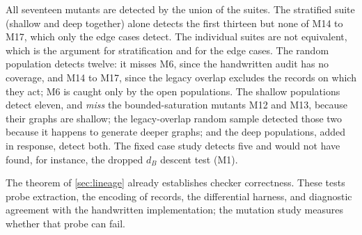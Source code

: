All seventeen mutants are detected by the union of the suites. The stratified suite (shallow and deep together) alone detects the first thirteen but none of M14 to M17, which only the edge cases detect. The individual suites are not equivalent, which is the argument for stratification and for the edge cases. The random population detects twelve: it misses M6, since the handwritten audit has no coverage, and M14 to M17, since the legacy overlap excludes the records on which they act; M6 is caught only by the open populations. The shallow populations detect eleven, and \emph{miss} the bounded-saturation mutants M12 and M13, because their graphs are shallow; the legacy-overlap random sample detected those two because it happens to generate deeper graphs; and the deep populations, added in response, detect both. The fixed case study detects five and would not have found, for instance, the dropped $d_B$ descent test (M1).

The theorem of \cref{sec:lineage} already establishes checker correctness. These tests probe extraction, the encoding of records, the differential harness, and diagnostic agreement with the handwritten implementation; the mutation study measures whether that probe can fail.
